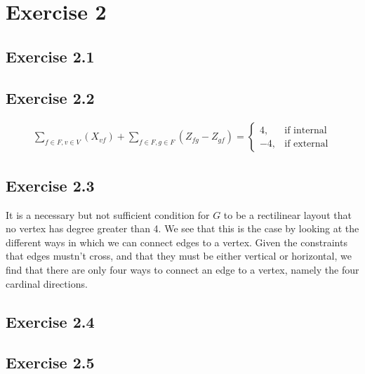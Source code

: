 \documentclass[12pt]{article}
\begin{document}
\section*{Exercise 2}
\subsection*{Exercise 2.1}

\subsection*{Exercise 2.2}
\begin{align*}
    \sum_{f \in F, v \in V}(X_{vf}) + \sum_{f \in F, g \in F}(Z_{fg}-Z_{gf}) = \begin{cases}
                                                                                     4, & \text{if internal}\\
                                                                                    -4, & \text{if external}
                                                                               \end{cases}
\end{align*}

\subsection*{Exercise 2.3}
It is a necessary but not sufficient condition for $G$ to be a rectilinear layout that no vertex has degree greater than 4. We see that this is the case by looking at the different ways in which we can connect edges to a vertex. Given the constraints that edges mustn't cross, and that they must be either vertical or horizontal, we find that there are only four ways to connect an edge to a vertex, namely the four cardinal directions.



\subsection*{Exercise 2.4}

\subsection*{Exercise 2.5}
\end{document}
